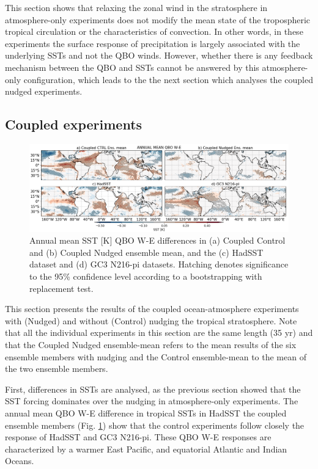 This section shows that relaxing the zonal wind in the stratosphere in atmosphere-only experiments does not modify the mean state of the tropospheric tropical circulation or the characteristics of convection. In other words, in these experiments the surface response of precipitation is largely associated with the underlying SSTs and not the QBO winds. However, whether there is any feedback mechanism between the QBO and SSTs cannot be answered by this atmosphere-only configuration, which leads to the the next section which analyses the coupled nudged experiments. 

\subsection{Coupled experiments}

\begin{figure}[t!]
\centering
 \includegraphics[width=\linewidth]{figures/sstseasonal_climqbowqboe.png}
\caption[Annual mean SST response to the QBO in coupled nudged experiments]{ Annual mean SST [K] QBO W-E differences in (a) Coupled Control and (b) Coupled Nudged ensemble mean, and the (c) HadSST dataset and (d) GC3 N216-pi datasets. Hatching denotes significance to the 95\% confidence level according to a bootstrapping with replacement test.}
\label{fig:sst_clim_coupled}
\end{figure}


This section presents the results of the coupled ocean-atmosphere experiments with (Nudged) and without (Control) nudging the tropical stratosphere. Note that all the individual experiments in this section are the same length (35 yr) and that the Coupled Nudged  ensemble-mean refers to the mean results of the six ensemble members with nudging and the Control ensemble-mean to the mean of the two ensemble members.

First, differences in SSTs are analysed, as the previous section showed that the SST forcing dominates over the nudging in atmosphere-only experiments.
The annual mean QBO W-E difference in tropical SSTs in HadSST the coupled ensemble members (Fig. \ref{fig:sst_clim_coupled}) show that the control experiments follow closely the response of HadSST and GC3 N216-pi. These QBO W-E responses are characterized by a warmer East Pacific, and equatorial Atlantic and Indian Oceans. 

